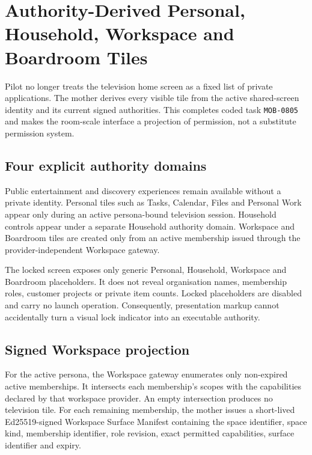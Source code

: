 \section{Authority-Derived Personal, Household, Workspace and Boardroom Tiles}
\label{sec:pilot-mobile-authority-derived-tv-tiles}

Pilot no longer treats the television home screen as a fixed list of private
applications.  The mother derives every visible tile from the active shared-screen
identity and its current signed authorities.  This completes coded task
\texttt{MOB-0805} and makes the room-scale interface a projection of permission,
not a substitute permission system.

\subsection{Four explicit authority domains}

Public entertainment and discovery experiences remain available without a private
identity.  Personal tiles such as Tasks, Calendar, Files and Personal Work appear
only during an active persona-bound television session.  Household controls appear
under a separate Household authority domain.  Workspace and Boardroom tiles are
created only from an active membership issued through the provider-independent
Workspace gateway.

The locked screen exposes only generic Personal, Household, Workspace and Boardroom
placeholders.  It does not reveal organisation names, membership roles, customer
projects or private item counts.  Locked placeholders are disabled and carry no
launch operation.  Consequently, presentation markup cannot accidentally turn a
visual lock indicator into an executable authority.

\subsection{Signed Workspace projection}

For the active persona, the Workspace gateway enumerates only non-expired active
memberships.  It intersects each membership's scopes with the capabilities declared
by that workspace provider.  An empty intersection produces no television tile.
For each remaining membership, the mother issues a short-lived Ed25519-signed
Workspace Surface Manifest containing the space identifier, space kind, membership
identifier, role revision, exact permitted capabilities, surface identifier and
expiry.

